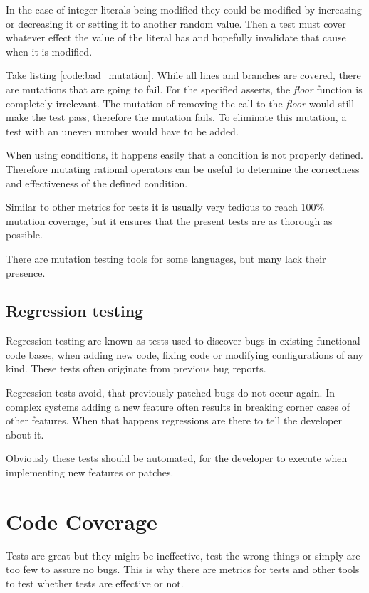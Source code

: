 In the case of integer literals being modified they could be modified by
increasing or decreasing it or setting it to another random value. Then a test
must cover whatever effect the value of the literal has and hopefully
invalidate that cause when it is modified.

Take listing \ref{code:bad_mutation}. While all lines and branches are covered,
there are mutations that are going to fail. For the specified asserts, the
\textit{floor} function is completely irrelevant. The mutation of removing the
call to the \textit{floor} would still make the test pass, therefore the
mutation fails. To eliminate this mutation, a test with an uneven number would
have to be added.

When using conditions, it happens easily that a condition is not properly
defined. Therefore mutating rational operators can be useful to determine the
correctness and effectiveness of the defined condition.

Similar to other metrics for tests it is usually very tedious to reach 100\%
mutation coverage, but it ensures that the present tests are as thorough as
possible.

There are mutation testing tools for some languages, but many lack their
presence.

\cite{mutation_testing}

\subsection{Regression testing}

Regression testing are known as tests used to discover bugs in existing
functional code bases, when adding new code, fixing code or modifying
configurations of any kind. These tests often originate from previous bug
reports.

Regression tests avoid, that previously patched bugs do not occur again. In
complex systems adding a new feature often results in breaking corner cases of
other features. When that happens regressions are there to tell the developer
about it. \cite{regression_tests}

Obviously these tests should be automated, for the developer to execute when
implementing new features or patches.

\section{Code Coverage}

Tests are great but they might be ineffective, test the wrong things
or simply are too few to assure no bugs. This is why there are metrics
for tests and other tools to test whether tests are effective or not.

